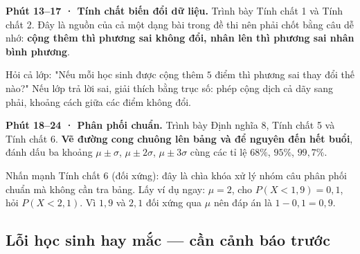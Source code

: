 \documentclass[11pt, a4paper]{article}
\begin{document}
\textbf{Phút 13–17 · Tính chất biến đổi dữ liệu.} Trình bày Tính chất 1 và Tính chất 2. Đây là nguồn của cả một dạng bài trong đề thi nên phải chốt bằng câu dễ nhớ: \textbf{cộng thêm thì phương sai không đổi, nhân lên thì phương sai nhân bình phương}.

Hỏi cả lớp: "Nếu mỗi học sinh được cộng thêm $5$ điểm thì phương sai thay đổi thế nào?" Nếu lớp trả lời sai, giải thích bằng trục số: phép cộng dịch cả dãy sang phải, khoảng cách giữa các điểm không đổi.

\textbf{Phút 18–24 · Phân phối chuẩn.} Trình bày Định nghĩa 8, Tính chất 5 và Tính chất 6. \textbf{Vẽ đường cong chuông lên bảng và để nguyên đến hết buổi}, đánh dấu ba khoảng $\mu \pm \sigma$, $\mu \pm 2\sigma$, $\mu \pm 3\sigma$ cùng các tỉ lệ $68\%$, $95\%$, $99,7\%$.

Nhấn mạnh Tính chất 6 (đối xứng): đây là chìa khóa xử lý nhóm câu phân phối chuẩn mà không cần tra bảng. Lấy ví dụ ngay: $\mu = 2$, cho $P(X < 1,9) = 0,1$, hỏi $P(X < 2,1)$. Vì $1,9$ và $2,1$ đối xứng qua $\mu$ nên đáp án là $1 - 0,1 = 0,9$.

\subsection{Lỗi học sinh hay mắc — cần cảnh báo trước}

\end{document}
